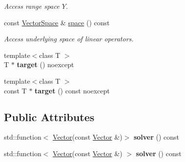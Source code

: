 \begin{DoxyCompactItemize}
\begin{DoxyCompactList}\small\item\em \-Access range space $Y$. \end{DoxyCompactList}\item 
\hypertarget{classSpacy_1_1LinearOperator_ad0116ec957dfb6bc490a4c9702929f8e}{const \hyperlink{classSpacy_1_1VectorSpace}{\-Vector\-Space} \& \hyperlink{classSpacy_1_1LinearOperator_ad0116ec957dfb6bc490a4c9702929f8e}{space} () const }\label{classSpacy_1_1LinearOperator_ad0116ec957dfb6bc490a4c9702929f8e}

\begin{DoxyCompactList}\small\item\em \-Access underlying space of linear operators. \end{DoxyCompactList}\item 
\hypertarget{classSpacy_1_1LinearOperator_a74d3f8b5e058d6df4921f63c9023f01c}{{\footnotesize template$<$class T $>$ }\\\-T $\ast$ {\bfseries target} () noexcept}\label{classSpacy_1_1LinearOperator_a74d3f8b5e058d6df4921f63c9023f01c}

\item 
\hypertarget{classSpacy_1_1LinearOperator_a275563d8e433f8d714e84022f8f130a3}{{\footnotesize template$<$class T $>$ }\\const \-T $\ast$ {\bfseries target} () const noexcept}\label{classSpacy_1_1LinearOperator_a275563d8e433f8d714e84022f8f130a3}

\end{DoxyCompactItemize}
\subsection*{\-Public \-Attributes}
\begin{DoxyCompactItemize}
\item 
\hypertarget{classSpacy_1_1LinearOperator_a8ff75bb0ca4fa981e292e4768e4a2cc1}{std\-::function$<$ \hyperlink{classSpacy_1_1Vector}{\-Vector}(const \*
\hyperlink{classSpacy_1_1Vector}{\-Vector} \&)$>$ {\bfseries solver} () const }\label{classSpacy_1_1LinearOperator_a8ff75bb0ca4fa981e292e4768e4a2cc1}

\item 
\hypertarget{classSpacy_1_1LinearOperator_ab9b19859725956cf136806610a56cd92}{std\-::function$<$ \hyperlink{classSpacy_1_1Vector}{\-Vector}(const \*
\hyperlink{classSpacy_1_1Vector}{\-Vector} \&) $>$ {\bfseries solver} () const }\label{classSpacy_1_1LinearOperator_ab9b19859725956cf136806610a56cd92}

\end{DoxyCompactItemize}


